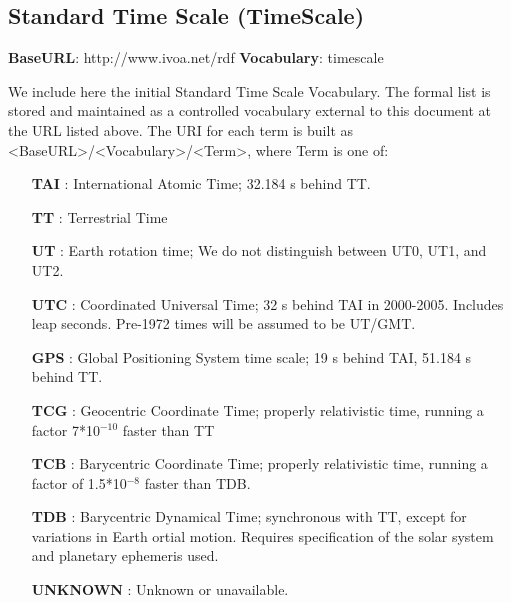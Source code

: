   \subsection{Standard Time Scale (TimeScale)}
  \label{sect:TimeScale}

  \textbf{BaseURL}:  http://www.ivoa.net/rdf \newline
  \textbf{Vocabulary}: timescale \newline

  We include here the initial Standard Time Scale Vocabulary.  The formal list is stored and maintained as a controlled vocabulary external to this document at the URL listed above.  The URI for each term is built as <BaseURL>/<Vocabulary>/<Term>, where Term is one of:

  \small
  \begin{itemize}
    \item[\textbf{TAI}]:  International Atomic Time; 32.184 s behind TT.
    \item[\textbf{TT}]:  Terrestrial Time
    \item[\textbf{UT}]:  Earth rotation time; \newline We do not distinguish between UT0, UT1, and UT2.
    \item[\textbf{UTC}]:  Coordinated Universal Time; 32 s behind TAI in 2000-2005. \newline Includes leap seconds. Pre-1972 times will be assumed to be UT/GMT.
    \item[\textbf{GPS}]:  Global Positioning System time scale; 19 s behind TAI, 51.184 s behind TT.
    \item[\textbf{TCG}]:  Geocentric Coordinate Time; properly relativistic time, running a factor 7*10$^{-10}$ faster than TT
    \item[\textbf{TCB}]:  Barycentric Coordinate Time; properly relativistic time, running a factor of 1.5*10$^{-8}$ faster than TDB.
    \item[\textbf{TDB}]:  Barycentric Dynamical Time; synchronous with TT, except for variations in Earth ortial motion. \newline Requires specification of the solar system and planetary ephemeris used.
    \item[\textbf{UNKNOWN}]:  Unknown or unavailable.
  \end{itemize}
  \normalsize


